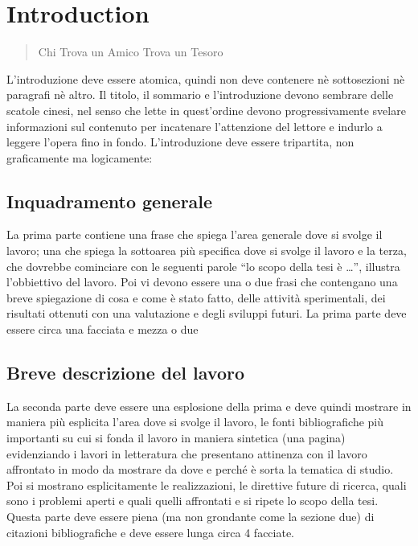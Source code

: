 \chapter{Introduction}
\label{ch:intro}
\thispagestyle{empty}
\setcounter{page}{1}
\begin{quotation}
{\footnotesize
{}
\begin{flushright}
Chi Trova un Amico Trova un Tesoro
\end{flushright}
}
\end{quotation}
\vspace{0.5cm}

\noindent L'introduzione deve essere atomica, quindi non deve contenere n\`e sottosezioni n\`e paragrafi n\`e altro. Il titolo, il sommario e l'introduzione devono sembrare delle scatole cinesi, nel senso che lette in quest'ordine devono progressivamente svelare informazioni sul contenuto per incatenare l'attenzione del lettore e indurlo a leggere l'opera fino in fondo. L'introduzione deve essere tripartita, non graficamente ma logicamente: \cite{asdf}

\section{Inquadramento generale}
La prima parte contiene una frase che spiega l'area generale dove si svolge il lavoro; una che spiega la sottoarea pi\`u specifica dove si svolge il lavoro e la terza, che dovrebbe cominciare con le seguenti parole ``lo scopo della tesi \`e \dots'', illustra l'obbiettivo del lavoro. Poi vi devono essere una o due frasi che contengano una breve spiegazione di cosa e come \`e stato fatto, delle attivit\`a sperimentali, dei risultati ottenuti con una valutazione e degli sviluppi futuri. La prima parte deve essere circa una facciata e mezza o due

\section{Breve descrizione del lavoro}
La seconda parte deve essere una esplosione della prima e deve quindi mostrare in maniera pi\`u esplicita l'area dove si svolge il lavoro, le fonti bibliografiche pi\`u importanti su cui si fonda il lavoro in maniera sintetica (una pagina) evidenziando i lavori in letteratura che presentano attinenza con il lavoro affrontato in modo da mostrare da dove e perch\'e \`e sorta la tematica di studio. Poi si mostrano esplicitamente le realizzazioni, le direttive future di ricerca, quali sono i problemi aperti e quali quelli affrontati e si ripete lo scopo della tesi. Questa parte deve essere piena (ma non grondante come la sezione due) di citazioni bibliografiche e deve essere lunga circa 4 facciate.

